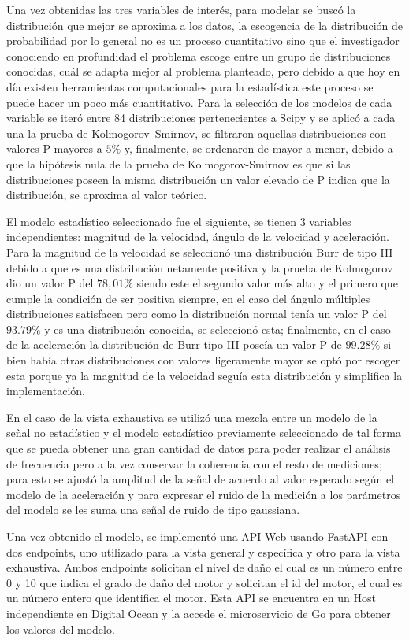Una vez obtenidas las tres variables de interés, para modelar se buscó la
distribución que mejor se aproxima a los datos, la escogencia de la
distribución de probabilidad por lo general no es un proceso cuantitativo sino
que el investigador conociendo en profundidad el problema escoge entre un grupo
de distribuciones conocidas, cuál se adapta mejor al problema planteado, pero
debido a que hoy en día existen herramientas computacionales para la
estadística este proceso se puede hacer un poco más cuantitativo. Para la
selección de los modelos de cada variable se iteró entre 84 distribuciones
pertenecientes a Scipy y se aplicó a cada una la prueba de Kolmogorov–Smirnov,
se filtraron aquellas distribuciones con valores P mayores a $5\%$ y, finalmente, se
ordenaron de mayor a menor, debido a que la hipótesis nula de la
prueba de Kolmogorov-Smirnov es que si las distribuciones poseen la misma
distribución un valor elevado de P indica que la distribución, se aproxima al
valor teórico.

El modelo estadístico seleccionado fue el siguiente, se tienen 3
variables independientes: magnitud de la velocidad, ángulo de la velocidad y
aceleración. Para la magnitud de la velocidad se seleccionó una distribución
Burr de tipo III debido a que es una distribución netamente positiva y la
prueba de Kolmogorov dio un valor P del $78,01\%$ siendo este el segundo valor más
alto y el primero que cumple la condición de ser positiva siempre, en el caso
del ángulo múltiples distribuciones satisfacen pero como la distribución normal
tenía un valor P del $93.79\%$ y es una distribución conocida, se seleccionó esta;
finalmente, en el caso de la aceleración la distribución de Burr tipo III poseía
un valor P de $99.28\%$ si bien había otras distribuciones con valores ligeramente
mayor se optó por escoger esta porque ya la magnitud de la velocidad seguía esta
distribución y simplifica la implementación.

En el caso de la vista exhaustiva se utilizó una mezcla entre un modelo de la
señal no estadístico y el modelo estadístico previamente seleccionado de tal
forma que se pueda obtener una gran cantidad de datos para poder realizar el
análisis de frecuencia pero a la vez conservar la coherencia con el resto de
mediciones; para esto se ajustó la amplitud de la señal de acuerdo al valor
esperado según el modelo de la aceleración y para expresar el ruido de la
medición a los parámetros del modelo se les suma una señal de ruido de tipo
gaussiana.

Una vez obtenido el modelo, se implementó una API Web usando FastAPI con dos
endpoints, uno utilizado para la vista general y específica y otro para la
vista exhaustiva. Ambos endpoints solicitan el nivel de daño el cual es un
número entre 0 y 10 que indica el grado de daño del motor y solicitan el id del
motor, el cual es un número entero  que identifica el motor. Esta API se encuentra
en un Host independiente en Digital Ocean y la accede el microservicio de Go
para obtener los valores del modelo.
